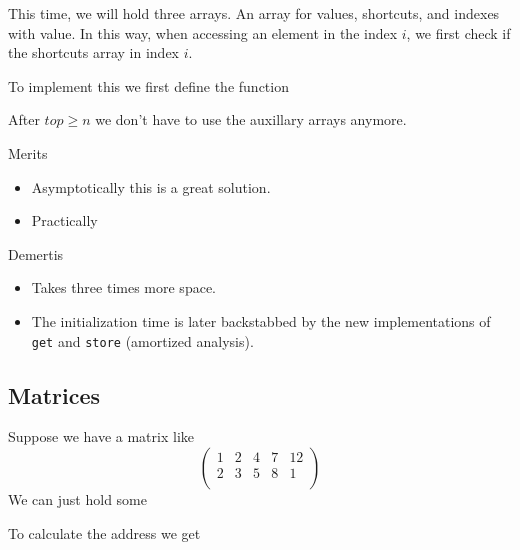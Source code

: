 \documentclass[11pt,a4paper]{article}
\begin{document}
\begin{example}
  This time, we will hold three arrays.
  An array for values, shortcuts, and indexes with value.
  In this way, when accessing an element in the index $i$, we first
  check if the shortcuts array in index $i$.
\end{example}

To implement this we first define the function

%
%
%
%

\begin{remark}
  After $top \geq n$ we don't have to use the auxillary arrays anymore.
\end{remark}

Merits
\begin{itemize}
  \item Asymptotically this is a great solution.
  \item Practically
\end{itemize}

Demertis
\begin{itemize}
  \item Takes three times more space.
  \item The initialization time is later backstabbed by the new implementations
    of \texttt{get} and \texttt{store} (amortized analysis).
\end{itemize}

\subsection{Matrices}

\begin{example}
  Suppose we have a matrix like
  \[\begin{pmatrix}
    1 & 2 & 4 & 7 & 12 \\
    2 & 3 & 5 & 8 & 1 \\
  \end{pmatrix}\]
  We can just hold some

  To calculate the address we get
\end{example}
\end{document}
